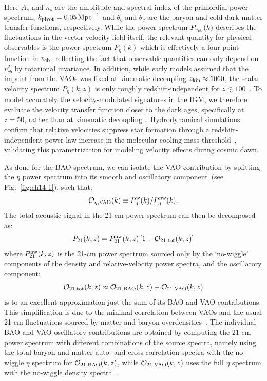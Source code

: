 Here $A_s$ and $n_s$ are the amplitude and spectral index of the primordial power spectrum, $k_{\rm pivot}=0.05\,\rm{Mpc}^{-1}$ and $\theta_b$ and $\theta_c$ are the baryon and cold dark matter transfer functions, respectively. While the power spectrum $P_{v_{\rm cb}}(k)$ describes the fluctuations in the vector velocity field itself, the relevant quantity for physical observables is the power spectrum $P_\eta(k)$ which is effectively a four-point function in $v_{\rm cb}$, reflecting the fact that observable quantities can only depend on $v_{cb}^2$ by rotational invariance. In addition, while early models assumed that the imprint from the VAOs was fixed at kinematic decoupling $z_{\rm kin}\approx 1060$, the scalar velocity spectrum $P_\eta(k,z)$ is only roughly redshift-independent for $z\lesssim 100$~\citep{ferraro12, Yoo:2011tq}. To model accurately the velocity-modulated signatures in the IGM, we therefore evaluate the velocity transfer function closer to the dark ages, specifically at $z=50$, rather than at kinematic decoupling~\cite{cruz25}. Hydrodynamical simulations confirm that relative velocities suppress star formation through a redshift-independent power-law increase in the molecular cooling mass threshold~\citep{schauer19, kulkarni21, munoz22}, validating this parametrization for modeling velocity effects during cosmic dawn.

As done for the BAO spectrum, we can isolate the VAO contribution by splitting the $\eta$ power spectrum into its smooth and oscillatory component~(see Fig.~\ref{fig:ch14-1}), such that:
\begin{equation}
    \mathcal{O}_{\eta,\rm VAO}(k)\equiv P^{\rm w}_\eta(k)/P^{\rm nw}_\eta(k).
\end{equation}
The total acoustic signal in the 21-cm power spectrum can then be decomposed as:
\begin{equation}
    P_{21}(k,z)= P_{21}^{\rm nw}(k,z)\left[1+\mathcal{O}_{21,\rm tot}(k,z)\right] \label{eq:ch14-O21_v0}
\end{equation}
where $P^{\rm nw}_{21}(k,z)$ is the 21-cm power spectrum sourced only by the `no-wiggle' components of the density and relative-velocity power spectra, and the oscillatory component:
\begin{equation}
    \mathcal{O}_{21,\rm tot}(k,z) \approx \mathcal{O}_{21,\rm BAO}(k,z)+\mathcal{O}_{21,\rm VAO}(k,z) \label{eq:ch14-O21}
\end{equation}
is to an excellent approximation just the sum of its BAO and VAO contributions. This simplification is due to the minimal correlation between VAOs and the usual 21-cm fluctuations sourced by matter and baryon overdensities~\cite{dalal10,alihaimoud14, Munoz:2018jwq}. The individual BAO and VAO oscillatory contributions are obtained  by computing the 21-cm power spectrum with different combinations of the source spectra, namely using the total baryon and matter auto- and cross-correlation spectra with the no-wiggle $\eta$ spectrum for $\mathcal{O}_{21,\rm BAO}(k,z)$, while $\mathcal{O}_{21,\rm VAO}(k,z)$ uses the full $\eta$ spectrum with the no-wiggle density spectra~\cite{cruz25}.


